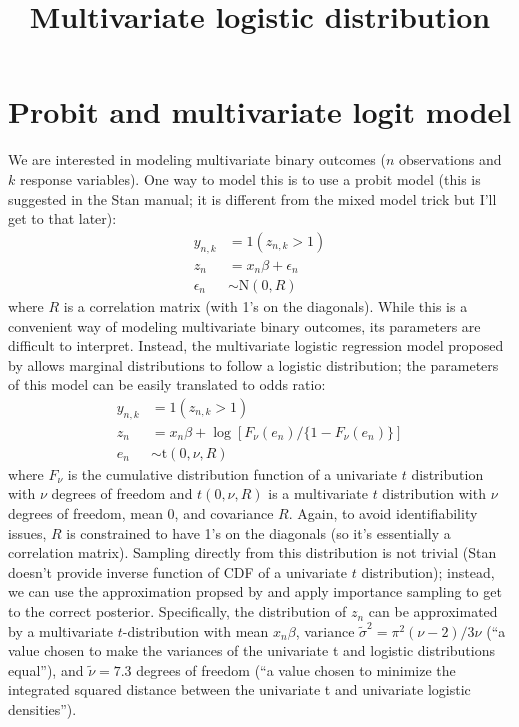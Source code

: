 \documentclass{article}\usepackage[]{graphicx}\usepackage[]{color}
\title{Multivariate logistic distribution}
\begin{document}
\maketitle

\section{Probit and multivariate logit model}

We are interested in modeling multivariate binary outcomes ($n$ observations and $k$ response variables). 
One way to model this is to use a probit model (this is suggested in the Stan manual; it is different from the mixed model trick but I'll get to that later):
\begin{equation}
\begin{aligned}
y_{n,k} &= 1(z_{n,k} > 1)\\
z_{n} &= x_n \beta + \epsilon_{n}\\
\epsilon_{n} &\sim \mathrm{N}(0, R)
\end{aligned}
\end{equation}
where $R$ is a correlation matrix (with 1's on the diagonals).
While this is a convenient way of modeling multivariate binary outcomes, its parameters are difficult to interpret. Instead, the multivariate logistic regression model proposed by \cite{o2004bayesian} allows marginal distributions to follow a logistic distribution; the parameters of this model can be easily translated to odds ratio:
\begin{equation}
\begin{aligned}
y_{n,k} &= 1(z_{n,k} > 1)\\
z_{n} &= x_n \beta + \log[F_\nu(e_n)/\{1 - F_\nu(e_n)\}]\\
e_n &\sim \mathrm{t}(0, \nu, R)
\end{aligned}
\end{equation}
where $F_\nu$ is the cumulative distribution function of a univariate $t$ distribution with $\nu$ degrees of freedom and $t(0, \nu, R)$ is a multivariate $t$ distribution with $\nu$ degrees of freedom, mean 0, and covariance $R$.
Again, to avoid identifiability issues, $R$ is constrained to have 1's on the diagonals (so it's essentially a correlation matrix).
Sampling directly from this distribution is not trivial (Stan doesn't provide inverse function of CDF of a univariate $t$ distribution); instead, we can use the approximation propsed by \cite{o2004bayesian} and apply importance sampling to get to the correct posterior. 
Specifically, the distribution of $z_n$ can be approximated by a multivariate $t$-distribution with mean $x_n\beta$, variance $\tilde \sigma^2 = \pi^2 (\nu - 2)/3 \nu$ (``a value chosen to make the variances of the univariate t and logistic distributions equal''), and $\tilde \nu = 7.3$ degrees of freedom (``a value chosen to minimize the integrated squared distance between the univariate t and univariate logistic densities'').
\end{document}
